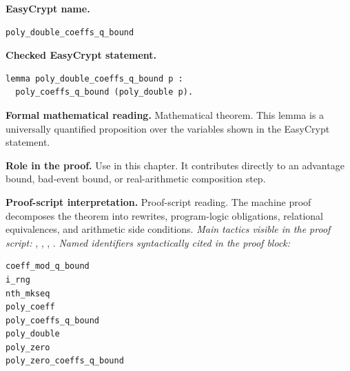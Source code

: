 \begin{formaltheorem}
\noindent\textbf{EasyCrypt name.}
\begin{lstlisting}[language=EasyCrypt,basicstyle=\ttfamily\scriptsize]
poly_double_coeffs_q_bound
\end{lstlisting}
\noindent\textbf{Checked EasyCrypt statement.}
\begin{lstlisting}[language=EasyCrypt,basicstyle=\ttfamily\scriptsize]
lemma poly_double_coeffs_q_bound p :
  poly_coeffs_q_bound (poly_double p).
\end{lstlisting}
\noindent\textbf{Formal mathematical reading.}
Mathematical theorem. This lemma is a universally quantified proposition over the variables shown in the EasyCrypt statement.

\noindent\textbf{Role in the proof.}
Use in this chapter. It contributes directly to an advantage bound, bad-event bound, or real-arithmetic composition step.

\noindent\textbf{Proof-script interpretation.}
Proof-script reading. The machine proof decomposes the theorem into rewrites, program-logic obligations, relational equivalences, and arithmetic side conditions.
\emph{Main tactics visible in the proof script:} , , , .
\emph{Named identifiers syntactically cited in the proof block:}
\begin{lstlisting}[language=EasyCrypt,basicstyle=\ttfamily\scriptsize]
coeff_mod_q_bound
i_rng
nth_mkseq
poly_coeff
poly_coeffs_q_bound
poly_double
poly_zero
poly_zero_coeffs_q_bound
\end{lstlisting}

\end{formaltheorem}

